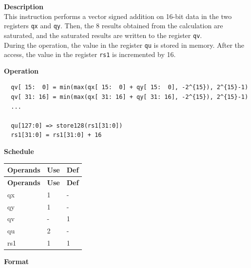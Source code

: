 \textbf{Description}\\
This instruction performs a vector signed addition on 16-bit data in the two registers \lstinline{qx} and \lstinline{qy}. Then, the 8 results obtained from the calculation are saturated, and the saturated results are written to the register \lstinline{qv}. \\ During the operation, the value in the register \lstinline{qu} is stored in memory. After the access, the value in the register \lstinline{rs1} is incremented by 16.

\textbf{Operation}\\
\begin{lstlisting}
  qv[ 15:  0] = min(max(qx[ 15:  0] + qy[ 15:  0], -2^{15}), 2^{15}-1)
  qv[ 31: 16] = min(max(qx[ 31: 16] + qy[ 31: 16], -2^{15}), 2^{15}-1)
  ...

  qu[127:0] => store128(rs1[31:0])
  rs1[31:0] = rs1[31:0] + 16
\end{lstlisting}

\textbf{Schedule}\\
\begin{longtable}[c]{|l|l|l|}
    \hline
    \rowcolor{lightgray}
    \textbf{Operands} & \textbf{Use} & \textbf{Def} \\\hline
    \endfirsthead
    \hline
    \rowcolor{lightgray}
     \textbf{Operands} & \textbf{Use} & \textbf{Def} \\\hline
    \endhead
    \hline
    \endfoot

    qx & 1 & - \\\hline
  qy & 1 & - \\\hline
     qv & - & 1 \\\hline
     qu & 2 & - \\\hline
     rs1 & 1 & 1

\end{longtable}

\textbf{Format}\\

